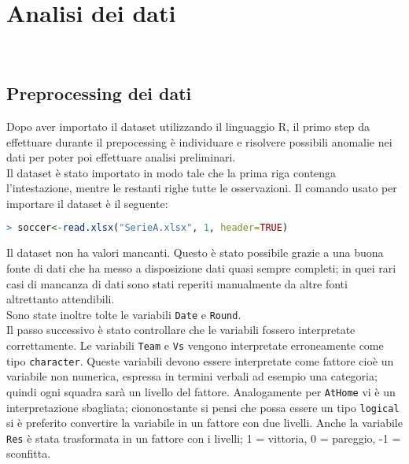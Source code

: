 
\chapter{Analisi dei dati}
\\


\section{Preprocessing dei dati}
Dopo aver importato il dataset utilizzando il linguaggio R, il primo step da effettuare durante il prepocessing è individuare e risolvere possibili anomalie nei dati per poter poi effettuare analisi preliminari.\\
Il dataset è stato importato in modo tale che la prima riga contenga l'intestazione, mentre le restanti righe tutte le osservazioni. Il comando usato per importare il dataset è il seguente:\\

\begin{lstlisting}[language=R]
> soccer<-read.xlsx("SerieA.xlsx", 1, header=TRUE)
\end{lstlisting}
\bigskip
Il dataset non ha valori mancanti. Questo è stato possibile grazie a una buona fonte di dati che ha messo a disposizione dati quasi sempre completi; in quei rari casi di mancanza di dati sono stati reperiti manualmente da altre fonti altrettanto attendibili.\\ %
Sono state inoltre tolte le variabili \texttt{Date} e \texttt{Round}.\\
Il passo successivo è stato controllare che le variabili fossero interpretate correttamente. Le variabili \texttt{Team} e \texttt{Vs} vengono interpretate erroneamente come tipo \texttt{character}. Queste variabili devono essere interpretate come fattore cioè un variabile non numerica, espressa in termini verbali ad esempio una categoria; quindi ogni squadra sarà un livello del fattore. Analogamente per \texttt{AtHome} vi è un interpretazione sbagliata; ciononostante si pensi che possa essere un tipo \texttt{logical} si è preferito convertire la variabile in un fattore con due livelli. Anche la variabile \texttt{Res} è stata trasformata in un fattore con i livelli; 1 = vittoria, 0 = pareggio, -1 = sconfitta.



